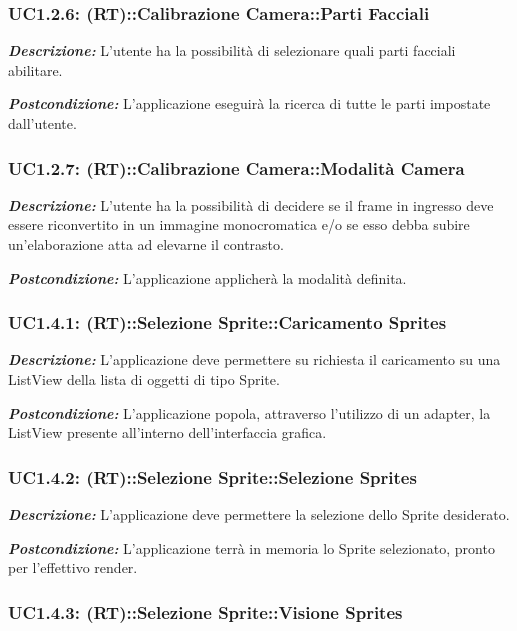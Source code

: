 \subsubsection{UC1.2.6: (RT)::Calibrazione Camera::Parti Facciali}

\textbf{\textit{Descrizione:}} L'utente ha la possibilità di selezionare quali parti facciali abilitare.

\textbf{\textit{Postcondizione:}} L'applicazione eseguirà la ricerca di tutte le parti impostate dall'utente.

\subsubsection{UC1.2.7: (RT)::Calibrazione Camera::Modalità Camera}

\textbf{\textit{Descrizione:}} L'utente ha la possibilità di decidere se il frame in ingresso deve essere riconvertito in un immagine monocromatica e/o se esso debba subire un'elaborazione atta ad elevarne il contrasto.

\textbf{\textit{Postcondizione:}} L'applicazione applicherà la modalità definita.

\subsubsection{UC1.4.1: (RT)::Selezione Sprite::Caricamento Sprites}

\textbf{\textit{Descrizione:}} L'applicazione deve permettere su richiesta il caricamento su una ListView della lista di oggetti di tipo Sprite.

\textbf{\textit{Postcondizione:}} L'applicazione popola, attraverso l'utilizzo di un adapter, la ListView presente all'interno dell'interfaccia grafica.

\subsubsection{UC1.4.2: (RT)::Selezione Sprite::Selezione Sprites}

\textbf{\textit{Descrizione:}} L'applicazione deve permettere la selezione dello Sprite desiderato.

\textbf{\textit{Postcondizione:}} L'applicazione terrà in memoria lo Sprite selezionato, pronto per l'effettivo render.

\subsubsection{UC1.4.3: (RT)::Selezione Sprite::Visione Sprites}

